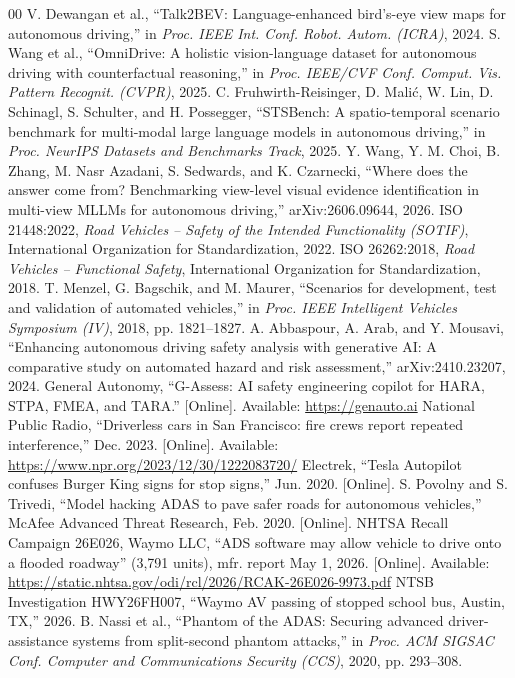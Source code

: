 \documentclass[conference]{IEEEtran}
\begin{document}
\begin{thebibliography}{00}
 V. Dewangan et al., ``Talk2BEV: Language-enhanced bird's-eye view maps for autonomous driving,'' in \emph{Proc. IEEE Int. Conf. Robot. Autom. (ICRA)}, 2024.
 S. Wang et al., ``OmniDrive: A holistic vision-language dataset for autonomous driving with counterfactual reasoning,'' in \emph{Proc. IEEE/CVF Conf. Comput. Vis. Pattern Recognit. (CVPR)}, 2025.
 C. Fruhwirth-Reisinger, D. Mali\'{c}, W. Lin, D. Schinagl, S. Schulter, and H. Possegger, ``STSBench: A spatio-temporal scenario benchmark for multi-modal large language models in autonomous driving,'' in \emph{Proc. NeurIPS Datasets and Benchmarks Track}, 2025.
 Y. Wang, Y. M. Choi, B. Zhang, M. Nasr Azadani, S. Sedwards, and K. Czarnecki, ``Where does the answer come from? Benchmarking view-level visual evidence identification in multi-view MLLMs for autonomous driving,'' arXiv:2606.09644, 2026.
 ISO 21448:2022, \emph{Road Vehicles -- Safety of the Intended Functionality (SOTIF)}, International Organization for Standardization, 2022.
 ISO 26262:2018, \emph{Road Vehicles -- Functional Safety}, International Organization for Standardization, 2018.
 T. Menzel, G. Bagschik, and M. Maurer, ``Scenarios for development, test and validation of automated vehicles,'' in \emph{Proc. IEEE Intelligent Vehicles Symposium (IV)}, 2018, pp. 1821--1827.
 A. Abbaspour, A. Arab, and Y. Mousavi, ``Enhancing autonomous driving safety analysis with generative AI: A comparative study on automated hazard and risk assessment,'' arXiv:2410.23207, 2024.
 General Autonomy, ``G-Assess: AI safety engineering copilot for HARA, STPA, FMEA, and TARA.'' [Online]. Available: \url{https://genauto.ai}
 National Public Radio, ``Driverless cars in San Francisco: fire crews report repeated interference,'' Dec. 2023. [Online]. Available: \url{https://www.npr.org/2023/12/30/1222083720/}
 Electrek, ``Tesla Autopilot confuses Burger King signs for stop signs,'' Jun. 2020. [Online].
 S. Povolny and S. Trivedi, ``Model hacking ADAS to pave safer roads for autonomous vehicles,'' McAfee Advanced Threat Research, Feb. 2020. [Online].
 NHTSA Recall Campaign 26E026, Waymo LLC, ``ADS software may allow vehicle to drive onto a flooded roadway'' (3,791 units), mfr. report May 1, 2026. [Online]. Available: \url{https://static.nhtsa.gov/odi/rcl/2026/RCAK-26E026-9973.pdf}
 NTSB Investigation HWY26FH007, ``Waymo AV passing of stopped school bus, Austin, TX,'' 2026.
 B. Nassi et al., ``Phantom of the ADAS: Securing advanced driver-assistance systems from split-second phantom attacks,'' in \emph{Proc. ACM SIGSAC Conf. Computer and Communications Security (CCS)}, 2020, pp. 293--308.

\end{thebibliography}
\end{document}
